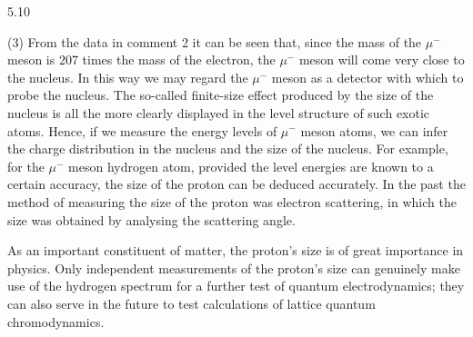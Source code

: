 \begin{solution}{5.10}
\begin{commentary}
(3) From the data in comment 2 it can be seen that, since the mass of the $\mu^-$ meson is 207
times the mass of the electron, the $\mu^-$ meson will come very close to the nucleus. In this
way we may regard the $\mu^-$ meson as a detector with which to probe the nucleus. The
so-called finite-size effect produced by the size of the nucleus is all the more clearly
displayed in the level structure of such exotic atoms. Hence, if we measure the energy levels
of $\mu^-$ meson atoms, we can infer the charge distribution in the nucleus and the size of the
nucleus. For example, for the $\mu^-$ meson hydrogen atom, provided the level energies are
known to a certain accuracy, the size of the proton can be deduced accurately. In the past the
method of measuring the size of the proton was electron scattering, in which the size was
obtained by analysing the scattering angle.

As an important constituent of matter, the proton's size is of great importance in physics. Only
independent measurements of the proton's size can genuinely make use of the hydrogen spectrum
for a further test of quantum electrodynamics; they can also serve in the future to test
calculations of lattice quantum chromodynamics.
\end{commentary}
\end{solution}

